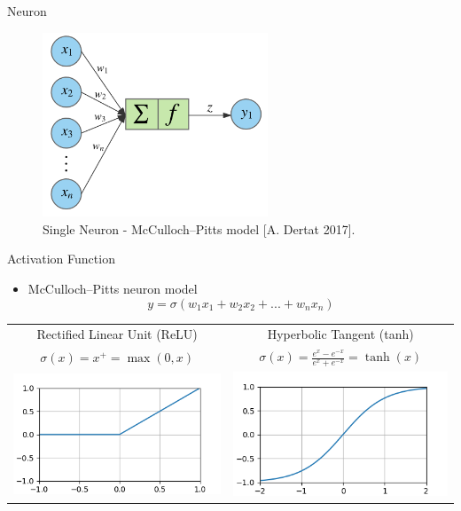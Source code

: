 \documentclass[11pt,t]{beamer}
\begin{document}
\begin{frame}[fragile]{Neuron}
\begin{figure}
	\centering
	\includegraphics[width=0.6\textwidth]{neuron}
	\caption*{Single Neuron - McCulloch–Pitts model [A. Dertat 2017].}
	\end{figure}
\end{frame}

\begin{frame}[fragile]{Activation Function}
   \begin{itemize}
      \item McCulloch–Pitts neuron model
      \begin{equation*}
      y = \sigma(w_1x_1+w_2x_2+...+w_nx_n)
      \end{equation*}
   \end{itemize}
   \begin{tabular}{c  c}
		Rectified Linear Unit (ReLU) &  Hyperbolic Tangent (tanh) \vspace{10pt} \\ 
		$\sigma(x) = x^+ = \max(0,x)$ & $\sigma(x) = \frac{e^x-e^{-x}}{e^x+e^{-x}} = \tanh(x)$ \\ 
			\includegraphics[width=.5\textwidth]{relu} &  \includegraphics[width=.5\textwidth]{tanh}
			
   \end{tabular}

\end{frame}
\end{document}
